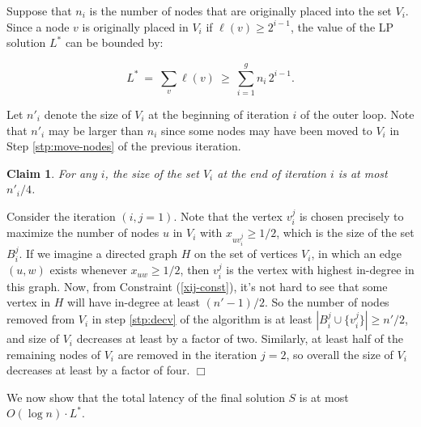 \documentclass[11pt]{article}
\newcommand{\qed}{\hspace*{\fill}$\Box$}
\newtheorem{claim}[theorem]{Claim}
\newenvironment{proof}[1][Proof. ]{\noindent {\bf #1 }}{\qed}
\begin{document}
\medskip



Suppose that $n_i$ is the number of nodes that are originally placed into the set  $V_i$. Since a node $v$ is originally placed in $V_i$ if $\ell(v)\geq 2^{i-1}$, the value of the LP solution $L^*$ can be bounded by:

\begin{equation}\label{eqn:opt-lower}
L^* ~=~ \sum_v \ell(v)  ~\geq~ \sum_{i=1}^g n_i \, 2^{i-1}.
\end{equation}

Let $n'_i$ denote the size of $V_i$ at the beginning of iteration $i$ of the outer loop. Note that $n'_i$ may be larger than $n_i$ since some nodes may have been moved to $V_i$ in Step \ref{stp:move-nodes} of the previous iteration.

\begin{claim} \label{cl:cov}
For any $i$, the size of the set $V_i$ at the end of iteration $i$ is at most $n'_i/4$.
\end{claim}
\begin{proof}
Consider the iteration $(i,j=1)$.  Note that the vertex $v^j_i$ is chosen precisely to maximize the number of nodes $u$ in $V_i$ with $x_{uv^j_i}\geq 1/2$, which is the size of the set $B^j_i$. If we imagine a directed graph $H$ on the set of vertices $V_i$, in which an edge $(u,w)$ exists whenever $x_{uw}\geq 1/2$, then $v^j_i$ is the vertex with highest in-degree in this graph. Now, from  Constraint (\ref{xij-const}), it's not hard to see that some vertex in $H$ will have in-degree at least $(n'-1)/2$. So the number of nodes removed from $V_i$ in step \ref{stp:decv} of the algorithm is at least $|B^j_i \cup \{v^j_i\}| \geq n'/2$, and size of $V_i$ decreases at least by a factor of two. Similarly, at least half of the remaining nodes of $V_i$ are removed in the iteration $j=2$, so overall the size of $V_i$ decreases at least by a factor of four.
\end{proof}

\medskip




We now show that the total latency of the final solution $S$ 
is at most $O(\log n)\cdot L^*$.
\end{document}
